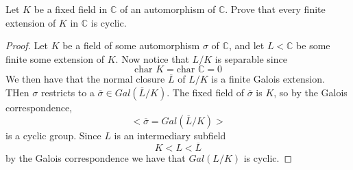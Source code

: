 \documentclass[11pt]{article}
\newenvironment{problem}[2][Problem\!]{\begin{tcolorbox}\begin{trivlist}
\item[\hskip \labelsep {\bfseries #1}\hskip \labelsep {\bfseries #2}]}{\end{trivlist}\end{tcolorbox}}
\newcommand{\cc}{\mathbb C}   %
\begin{document}
\vspace*{15pt}

\begin{problem} {14.9.13}
    Let $K$ be a fixed field in $\cc$ of an automorphism of $\cc$. Prove that every finite extension of $K$ in $\cc$ is cyclic. 
\end{problem}
\begin{proof}
    Let $K$ be a field of some automorphism $\sigma$ of $\cc$, and let $L < \cc$ be some finite some extension of $K$. Now notice that $L/K$ is separable since \[\text{char } K = \text{char } \cc = 0\]
    We then have that the normal closure $\overline{L}$ of $L/K$ is a finite Galois extension. THen $\sigma$ restricts to a $\overline{\sigma}\in Gal(\overline{L}/K)$. The fixed field of $\overline{\sigma}$ is $K$, so by the Galois correspondence,
    \[<\overline{\sigma} = Gal(\overline{L}/K)>\]
    is a cyclic group. Since $L$ is an intermediary subfield \[K < L < \overline{L}\]
    by the Galois correspondence we have that $Gal(L/K)$ is cyclic. 
\end{proof}
\end{document}
